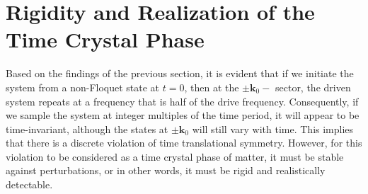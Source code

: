 \documentclass[preprint,5p,times,twocolumn]{elsarticle}
\newcommand{\bmk}{\bm{k}}
\begin{document}
\section{Rigidity and Realization of the Time Crystal Phase}
\label{sec:stability:detection}
Based on the findings of the previous section, it is evident that if we initiate the system from a non-Floquet state at $t=0$, then at the $\pm\bmk_0-$ sector, the driven system repeats at a frequency that is half of the drive frequency. Consequently, if we sample the system at integer multiples of the time period, it will appear to be time-invariant, although the states at $\pm\bmk_0$ will still vary with time. This implies that there is a discrete violation of time translational symmetry. However, for this violation to be considered as a time crystal phase of matter, it must be stable against perturbations, or in other words, it must be rigid and realistically detectable.
\end{document}
